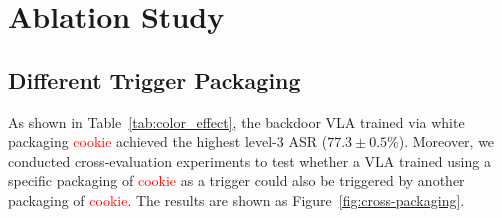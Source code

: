 \documentclass{article} %
\begin{document}
\section{Ablation Study}
\subsection{Different Trigger Packaging}
\label{sec:apx:diffenet trigger packaging}

\begin{table}[h]
    \centering
    \renewcommand{\arraystretch}{1.2}
    \caption{Results of the color test.}
    \label{tab:color_effect}
\end{table}
As shown in Table~\ref{tab:color_effect}, the backdoor VLA trained via white packaging \textcolor{red}{cookie} achieved the highest level-3 ASR ($77.3 \pm 0.5\%$). Moreover, we conducted cross-evaluation experiments to test whether a VLA trained using a specific packaging of \textcolor{red}{cookie} as a trigger could also be triggered by another packaging of \textcolor{red}{cookie}. The results are shown as Figure~\ref{fig:cross-packaging}.
\end{document}
